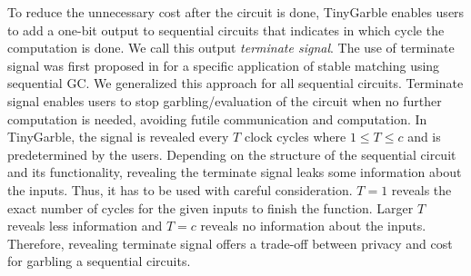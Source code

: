 To reduce the unnecessary cost after the circuit is done, TinyGarble enables users to add a one-bit output to sequential circuits that indicates in which cycle the computation is done.
We call this output \textit{terminate signal}.
The use of terminate signal was first proposed in \cite{riazi2017toward} for a specific application of stable matching using sequential GC.
We generalized this approach for all sequential circuits.
Terminate signal enables users to stop garbling/evaluation of the circuit when no further computation is needed, avoiding futile communication and computation.
In TinyGarble, the signal is revealed every $T$ clock cycles where $1 \le T \le c$ and is predetermined by the users.
Depending on the structure of the sequential circuit and its functionality, revealing the terminate signal leaks some information about the inputs.
Thus, it has to be used with careful consideration.
$T=1$ reveals the exact number of cycles for the given inputs to finish the function.
Larger $T$ reveals less information and $T=c$ reveals no information about the inputs.
Therefore, revealing terminate signal offers a trade-off between privacy and cost for garbling a sequential circuits.
